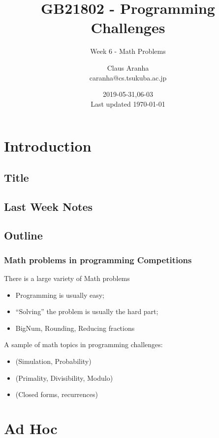 \documentclass{beamer}
\title[GB21802]{GB21802 - Programming Challenges}
\subtitle[]{Week 6 - Math Problems}
\author[Claus Aranha]{Claus Aranha\\{\footnotesize caranha@cs.tsukuba.ac.jp}}
\institute{College of Information Science}
\date{2019-05-31,06-03\\{\tiny Last updated \today}}
\begin{document}
\section{Introduction}
\subsection{Title}
\begin{frame}
\maketitle
\end{frame}

\subsection{Last Week Notes}



\subsection{Outline}
\begin{frame}
  \frametitle{Math problems in programming Competitions} {\smaller

    There is a large variety of Math problems
    \begin{itemize}
    \item Programming is usually easy;
    \item ``Solving'' the problem is usually the hard part;
    \item BigNum, Rounding, Reducing fractions
    \end{itemize}

    \bigskip

    A sample of math topics in programming challenges:
    \begin{itemize}
    \item {} (Simulation, Probability)
    \item {} (Primality, Divisibility, Modulo)
    \item {} (Closed forms, recurrences)
    \end{itemize}
  }
\end{frame}

\section{Ad Hoc}
\end{document}
